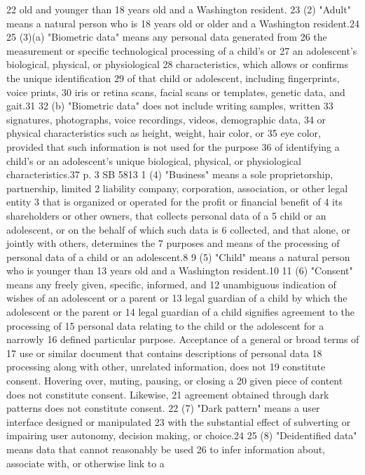 22 old and younger than 18 years old and a Washington resident.
23 (2) "Adult" means a natural person who is 18 years old or older
and a Washington resident.24
25 (3)(a) "Biometric data" means any personal data generated from
26 the measurement or specific technological processing of a child's or
27 an adolescent's biological, physical, or physiological
28 characteristics, which allows or confirms the unique identification
29 of that child or adolescent, including fingerprints, voice prints,
30 iris or retina scans, facial scans or templates, genetic data, and
gait.31
32 (b) "Biometric data" does not include writing samples, written
33 signatures, photographs, voice recordings, videos, demographic data,
34 or physical characteristics such as height, weight, hair color, or
35 eye color, provided that such information is not used for the purpose
36 of identifying a child's or an adolescent's unique biological,
physical, or physiological characteristics.37
p. 3 SB 5813
1 (4) "Business" means a sole proprietorship, partnership, limited
2 liability company, corporation, association, or other legal entity
3 that is organized or operated for the profit or financial benefit of
4 its shareholders or other owners, that collects personal data of a
5 child or an adolescent, or on the behalf of which such data is
6 collected, and that alone, or jointly with others, determines the
7 purposes and means of the processing of personal data of a child or
an adolescent.8
9 (5) "Child" means a natural person who is younger than 13 years
old and a Washington resident.10
11 (6) "Consent" means any freely given, specific, informed, and
12 unambiguous indication of wishes of an adolescent or a parent or
13 legal guardian of a child by which the adolescent or the parent or
14 legal guardian of a child signifies agreement to the processing of
15 personal data relating to the child or the adolescent for a narrowly
16 defined particular purpose. Acceptance of a general or broad terms of
17 use or similar document that contains descriptions of personal data
18 processing along with other, unrelated information, does not
19 constitute consent. Hovering over, muting, pausing, or closing a
20 given piece of content does not constitute consent. Likewise,
21 agreement obtained through dark patterns does not constitute consent.
22 (7) "Dark pattern" means a user interface designed or manipulated
23 with the substantial effect of subverting or impairing user autonomy,
decision making, or choice.24
25 (8) "Deidentified data" means data that cannot reasonably be used
26 to infer information about, associate with, or otherwise link to a
